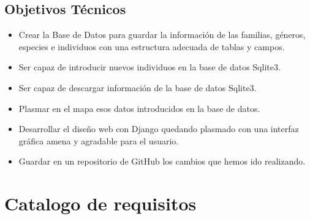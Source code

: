 \subsection{Objetivos Técnicos}
\begin{itemize}
	\item Crear la Base de Datos para guardar la información de las familias, géneros, especies e individuos con una estructura adecuada de tablas y campos.
	\item Ser capaz de introducir nuevos individuos en la base de datos Sqlite3.
	\item Ser capaz de descargar información de la base de datos Sqlite3.
	\item Plasmar en el mapa esos datos introducidos en la base de datos. 
	\item Desarrollar el diseño web con Django quedando plasmado con una interfaz gráfica amena y agradable para el usuario.
	\item Guardar en un repositorio de GitHub los cambios que hemos ido realizando.
	
\end{itemize}

\section{Catalogo de requisitos}
